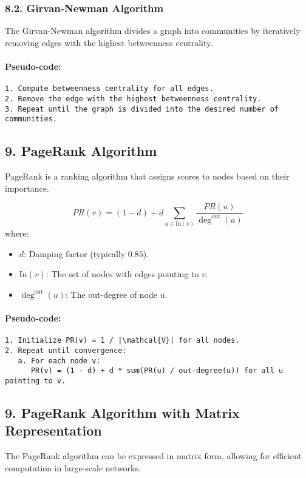 \documentclass[12pt, a4paper,oneside]{book}
\begin{document}
\subsubsection*{8.2. Girvan-Newman Algorithm}
The Girvan-Newman algorithm divides a graph into communities by iteratively removing edges with the highest betweenness centrality.

\paragraph{Pseudo-code:}
\begin{verbatim}
1. Compute betweenness centrality for all edges.
2. Remove the edge with the highest betweenness centrality.
3. Repeat until the graph is divided into the desired number of communities.
\end{verbatim}

\subsection*{9. PageRank Algorithm}
PageRank is a ranking algorithm that assigns scores to nodes based on their importance.

\[
PR(v) = (1 - d) + d \sum_{u \in \text{In}(v)} \frac{PR(u)}{\deg^{\text{out}}(u)}
\]
where:
\begin{itemize}
    \item \( d \): Damping factor (typically \( 0.85 \)).
    \item \( \text{In}(v) \): The set of nodes with edges pointing to \( v \).
    \item \( \deg^{\text{out}}(u) \): The out-degree of node \( u \).
\end{itemize}

\paragraph{Pseudo-code:}
\begin{verbatim}
1. Initialize PR(v) = 1 / |\mathcal{V}| for all nodes.
2. Repeat until convergence:
   a. For each node v:
      PR(v) = (1 - d) + d * sum(PR(u) / out-degree(u)) for all u pointing to v.
\end{verbatim}
\subsection*{9. PageRank Algorithm with Matrix Representation}

The PageRank algorithm can be expressed in matrix form, allowing for efficient computation in large-scale networks.
\end{document}
